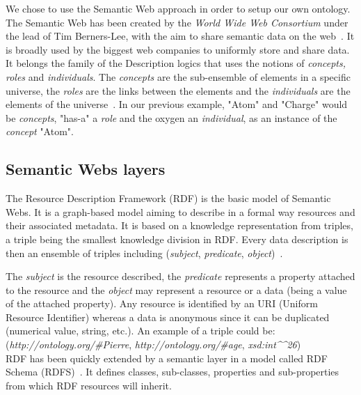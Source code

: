 \documentclass{vgtc}                          %
\begin{document}
We chose to use the Semantic Web approach in order to setup our own ontology. 
The Semantic Web has been created by the \textit{World Wide Web Consortium} under the lead of Tim Berners-Lee, with the aim to share semantic data on the web~\cite{berners2001semantic}. It is broadly used by the biggest web companies to uniformly store and share data. It belongs the family of the Description logics that uses the notions of \textit{concepts, roles} and \textit{individuals}. 
The \textit{concepts} are the sub-ensemble of elements in a specific universe, the \textit{roles} are the links between the elements and the \textit{individuals} are the elements of the universe~\cite{}. In our previous example, "Atom" and "Charge" would be \textit{concepts}, "has-a" a \textit{role} and the oxygen an \textit{individual}, as an instance of the \textit{concept} "Atom".

\subsection{Semantic Webs layers}

The Resource Description Framework (RDF) is the basic model of Semantic Webs. It is a graph-based model aiming to describe in a formal way resources and their associated metadata. It is based on a knowledge representation from triples, a triple being the smallest knowledge division in RDF. Every data description is then an ensemble of triples including (\textit{subject}, \textit{predicate}, \textit{object})~\cite{godel1999bach}.

The \textit{subject} is the resource described, the \textit{predicate} represents a property attached to the resource and the \textit{object} may represent a resource or a data (being a value of the attached property). Any resource is identified by an URI (Uniform Resource Identifier) whereas a data is anonymous since it can be duplicated (numerical value, string, etc.). An example of a triple could be:
\\
(\textit{http://ontology.org/\#Pierre}, \textit{http://ontology.org/\#age}, \textit{xsd:int\^{}\^{}26})
\\
RDF has been quickly extended by a semantic layer in a model called RDF Schema (RDFS)~\cite{brickley2004rdf}. It defines classes, sub-classes, properties and sub-properties from which RDF resources will inherit. 
\end{document}
